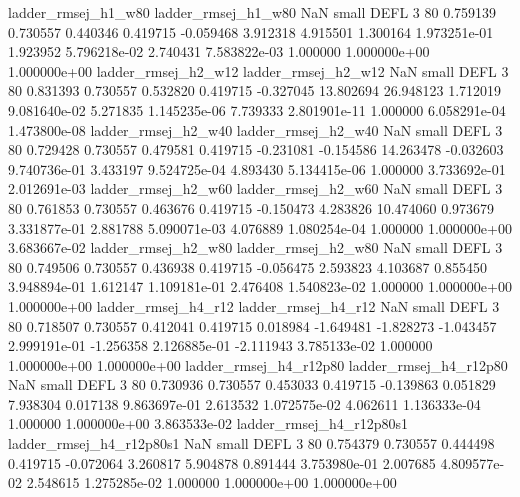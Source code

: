      ladder_rmsej_h1_w80      ladder_rmsej_h1_w80                   NaN      small     DEFL                 3 80 0.759139       0.730557 0.440346       0.419715   -0.059468      3.912318      4.915501     1.300164   1.973251e-01  1.923952 5.796218e-02     2.740431   7.583822e-03            1.000000    1.000000e+00        1.000000e+00
     ladder_rmsej_h2_w12      ladder_rmsej_h2_w12                   NaN      small     DEFL                 3 80 0.831393       0.730557 0.532820       0.419715   -0.327045     13.802694     26.948123     1.712019   9.081640e-02  5.271835 1.145235e-06     7.739333   2.801901e-11            1.000000    6.058291e-04        1.473800e-08
     ladder_rmsej_h2_w40      ladder_rmsej_h2_w40                   NaN      small     DEFL                 3 80 0.729428       0.730557 0.479581       0.419715   -0.231081     -0.154586     14.263478    -0.032603   9.740736e-01  3.433197 9.524725e-04     4.893430   5.134415e-06            1.000000    3.733692e-01        2.012691e-03
     ladder_rmsej_h2_w60      ladder_rmsej_h2_w60                   NaN      small     DEFL                 3 80 0.761853       0.730557 0.463676       0.419715   -0.150473      4.283826     10.474060     0.973679   3.331877e-01  2.881788 5.090071e-03     4.076889   1.080254e-04            1.000000    1.000000e+00        3.683667e-02
     ladder_rmsej_h2_w80      ladder_rmsej_h2_w80                   NaN      small     DEFL                 3 80 0.749506       0.730557 0.436938       0.419715   -0.056475      2.593823      4.103687     0.855450   3.948894e-01  1.612147 1.109181e-01     2.476408   1.540823e-02            1.000000    1.000000e+00        1.000000e+00
     ladder_rmsej_h4_r12      ladder_rmsej_h4_r12                   NaN      small     DEFL                 3 80 0.718507       0.730557 0.412041       0.419715    0.018984     -1.649481     -1.828273    -1.043457   2.999191e-01 -1.256358 2.126885e-01    -2.111943   3.785133e-02            1.000000    1.000000e+00        1.000000e+00
  ladder_rmsej_h4_r12p80   ladder_rmsej_h4_r12p80                   NaN      small     DEFL                 3 80 0.730936       0.730557 0.453033       0.419715   -0.139863      0.051829      7.938304     0.017138   9.863697e-01  2.613532 1.072575e-02     4.062611   1.136333e-04            1.000000    1.000000e+00        3.863533e-02
ladder_rmsej_h4_r12p80s1 ladder_rmsej_h4_r12p80s1                   NaN      small     DEFL                 3 80 0.754379       0.730557 0.444498       0.419715   -0.072064      3.260817      5.904878     0.891444   3.753980e-01  2.007685 4.809577e-02     2.548615   1.275285e-02            1.000000    1.000000e+00        1.000000e+00
